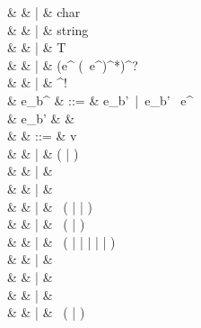 \documentclass[a4paper]{article}
\begin{document}
\begin{grammar}
                                    &              & |   &  char  \\
                                    &              & |   &  string  \\
                                    &              & |   & T\ \varepsilon \\
                                    &              & |   & \code{(} (e^{} (\code{,}\ e^{})^*)^? \code{)} \\
                                    &              & |   & \code{\#} \code{\{} ^! \code{\}} \\
             & {e_b}^{}  & ::= & e_b'\ |\ e_b' \code{;}\ e^{}\\
                                    & e_b'         &     & \hspace{-2em}  \\
                                    &              & ::= &\varepsilon {} v \\
                                    &              & |   & ( | )\ \varepsilon \\
                                    &              & |   & \varepsilon\ \varepsilon \\
                                    &              & |   & \varepsilon\ \code{\{}   \code{\}} \\
                                    &              & |   & \varepsilon\ (\code{*} | \code{/} | \code{\%})\ \varepsilon \\
                                    &              & |   & \varepsilon\ (\code{+} | \code{-})\ \varepsilon \\
                                    &              & |   & \varepsilon\ (\code{>=} | \code{>} | \code{==} | \code{/=} | \code{<} | \code{<=})\ \varepsilon \\
                                    &              & |   & \varepsilon\ \ \varepsilon {} \\
                                    &              & |   & \varepsilon\ \ \varepsilon {} \\
                                    &              & |   & \varepsilon\ \ \varepsilon {} \\
                                    &              & |   & \varepsilon\ (\code{>}\code{>} | \code{<}\code{<})\ \varepsilon \\

\end{grammar}
\end{document}
